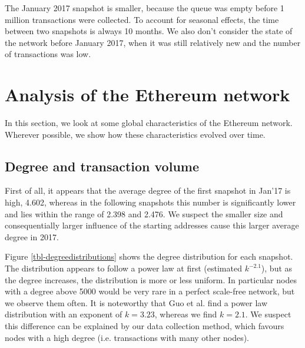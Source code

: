 \documentclass[10pt,a4paper]{article}
\begin{document}
\begin{multicols}{2}
The January 2017 snapshot is smaller, because the queue was empty before 1 million transactions were collected. To account for seasonal effects, the time between two snapshots is always 10 months. We also don't consider the state of the network before January 2017, when it was still relatively new and the number of transactions was low.

\section{Analysis of the Ethereum network}
In this section, we look at some global characteristics of the Ethereum network. Wherever possible, we show how these characteristics evolved over time.
\subsection{Degree and transaction volume}
First of all, it appears that the average degree of the first snapshot in Jan'17 is high, 4.602, whereas in the following snapshots this number is significantly lower and lies within the range of 2.398 and 2.476. We suspect the smaller size and consequentially larger influence of the starting addresses cause this larger average degree in 2017.

Figure \ref{tbl-degreedistributions} shows the degree distribution for each snapshot. The distribution appears to follow a power law at first (estimated $k^{-2.1}$), but as the degree increases, the distribution is more or less uniform. In particular nodes with a degree above 5000 would be very rare in a perfect scale-free network, but we observe them often. It is noteworthy that Guo et al. \cite{GUO201958} find a power law distribution with an exponent of $k = 3.23$, whereas we find $k=2.1$. We suspect this difference can be explained by our data collection method, which favours nodes with a high degree (i.e. transactions with many other nodes).
\end{multicols}
\end{document}
